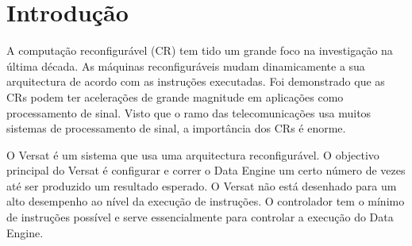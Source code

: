 
\chapter{Introdu\c{c}\~ao}
\label{chapter:introducao}






A computação reconfigurável (CR) tem tido um grande foco na investigação na última década. As máquinas reconfiguráveis mudam dinamicamente a sua arquitectura de acordo com as instruções executadas.
Foi demonstrado que as CRs podem ter acelerações de grande magnitude em aplicações como processamento de sinal. Visto que o ramo das telecomunicações usa muitos sistemas de processamento de sinal, a importância dos CRs é enorme.

O Versat é um sistema que usa uma arquitectura reconfigurável. O objectivo principal do Versat é configurar e correr o Data Engine um certo número de vezes até ser produzido um resultado esperado.
O Versat não está desenhado para um alto desempenho ao nível da execução de instruções. O controlador tem o mínimo de instruções possível e serve essencialmente para controlar a execução do Data Engine.

